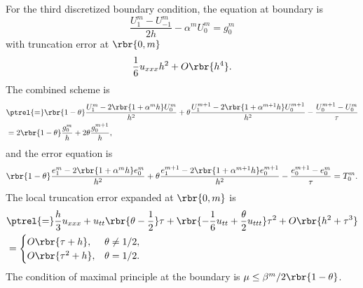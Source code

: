 \documentclass[english, nochinese]{pnote}
\begin{document}
For the third discretized boundary condition, the equation at boundary is
\begin{equation}
\frac{ U_1^m - U_{-1}^m }{ 2 h } - \alpha^m U_0^m = g_0^m
\end{equation}
with truncation error at $ \rbr{ 0, m } $
\begin{equation}
\frac{1}{6} u_{ x x x } h^2 + O \rbr{h^4}.
\end{equation}
The combined scheme is
\begin{equation}
\begin{split}
&\ptrel{=} \rbr{ 1 - \theta } \frac{ U_1^m - 2 \rbr{ 1 + \alpha^m h } U_0^m }{h^2} + \theta \frac{ U_1^{ m + 1 } - 2 \rbr{ 1 + \alpha^{ m + 1 } h } U_0^{ m + 1 } }{h^2} - \frac{ U_0^{ m + 1 } - U_0^m }{\tau} \\
&= 2 \rbr{ 1 - \theta } \frac{g_0^m}{h} + 2 \theta \frac{g_0^{ m + 1 }}{h},
\end{split}
\end{equation}
and the error equation is
\begin{equation}
\rbr{ 1 - \theta } \frac{ e_1^m - 2 \rbr{ 1 + \alpha^m h } e_0^m }{h^2} + \theta \frac{ e_1^{ m + 1 } - 2 \rbr{ 1 + \alpha^{ m + 1 } h } e_0^{ m + 1 } }{h^2} - \frac{ e_0^{ m + 1 } - e_0^m }{\tau} = T_0^m.
\end{equation}
The local truncation error expanded at $ \rbr{ 0, m } $ is
\begin{equation}
\begin{split}
&\ptrel{=} \frac{h}{3} u_{ x x x } + u_{ t t } \rbr{ \theta - \frac{1}{2} } \tau + \rbr{ -\frac{1}{6} u_{ t t } + \frac{\theta}{2} u_{ t t t } } \tau^2 + O \rbr{ h^2 + \tau^3 } \\
&=
\begin{cases}
O \rbr{ \tau + h }, & \theta \neq 1 / 2, \\
O \rbr{ \tau^2 + h }, & \theta = 1 / 2.
\end{cases}
\end{split}
\end{equation}
The condition of maximal principle at the boundary is $ \mu \le \beta^m / 2 \rbr{ 1 - \theta } $.
\end{document}
